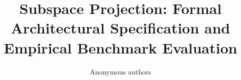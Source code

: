 \title{\textbf{Subspace Projection: Formal Architectural Specification and Empirical Benchmark Evaluation}}

\author{Anonymous authors}
